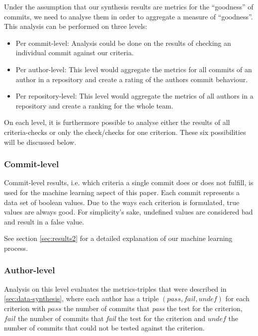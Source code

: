 
Under the assumption that our synthesis results are metrics for the ``goodness'' of commits, we need to analyse them in order to aggregate a measure of ``goodness''. This analysis can be performed on three levels:

\begin{itemize}
  \item Per commit-level: Analysis could be done on the results of checking an individual commit against our criteria.
  \item Per author-level: This level would aggregate the metrics for all commits of an author in a repository and create a rating of the authors commit behaviour.
  \item Per repository-level: This level would aggregate the metrics of all authors in a repository and create a ranking for the whole team.
\end{itemize}

On each level, it is furthermore possible to analyse either the results of all criteria-checks or only the check/checks for one criterion. These six possibilities will be discussed below.

\subsubsection{Commit-level}
\label{subs:Commit-level}
Commit-level results, i.e. which criteria a single commit does or does not fulfill, is used for the machine learning aspect of this paper. Each commit represents a data set of boolean values. Due to the ways each criterion is formulated, true values are always good. For simplicity's sake, undefined values are considered bad and result in a false value.

See section \ref{sec:results2} for a detailed explanation of our machine learning process.

\subsubsection{Author-level}
\label{subs:Author-level}
Analysis on this level evaluates the metrics-triples that were described in \ref{sec:data-synthesis}, where each author has a triple $(pass, fail, undef)$ for each criterion with $pass$ the number of commits that \emph{pass} the test for the criterion, $fail$ the number of commits that \emph{fail} the test for the criterion and $undef$ the number of commits that could not be tested against the criterion.


